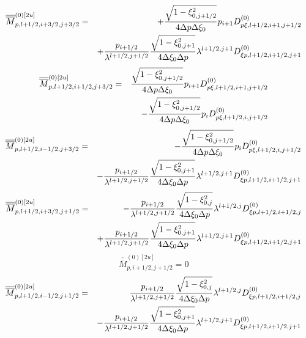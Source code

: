\begin{eqnarray}
\overline{\overline{M}}_{p,l+1/2,i+3/2,j+3/2}^{\left( 0\right) \left[ 2u%
\right] } &=&+\frac{\sqrt{1-\xi _{0,j+1/2}^{2}}}{4\Delta p\Delta \xi _{0}}%
p_{i+1}D_{p\xi ,l+1/2,i+1,j+1/2}^{\left( 0\right) }  \notag \\
&&+\frac{p_{i+1/2}}{\lambda ^{l+1/2,j+1/2}}\frac{\sqrt{1-\xi _{0,j+1}^{2}}}{%
4\Delta \xi _{0}\Delta p}\lambda ^{l+1/2,j+1}D_{\xi
p,l+1/2,i+1/2,j+1}^{\left( 0\right) }
\end{eqnarray}%
\begin{eqnarray}
\overline{\overline{M}}_{p,l+1/2,i+1/2,j+3/2}^{\left( 0\right) \left[ 2u%
\right] } &=&\frac{\sqrt{1-\xi _{0,j+1/2}^{2}}}{4\Delta p\Delta \xi _{0}}%
p_{i+1}D_{p\xi ,l+1/2,i+1,j+1/2}^{\left( 0\right) }  \notag \\
&&-\frac{\sqrt{1-\xi _{0,j+1/2}^{2}}}{4\Delta p\Delta \xi _{0}}p_{i}D_{p\xi
,l+1/2,i,j+1/2}^{\left( 0\right) }
\end{eqnarray}%
\begin{eqnarray}
\overline{\overline{M}}_{p,l+1/2,i-1/2,j+3/2}^{\left( 0\right) \left[ 2u%
\right] } &=&-\frac{\sqrt{1-\xi _{0,j+1/2}^{2}}}{4\Delta p\Delta \xi _{0}}%
p_{i}D_{p\xi ,l+1/2,i,j+1/2}^{\left( 0\right) }  \notag \\
&&-\frac{p_{i+1/2}}{\lambda ^{l+1/2,j+1/2}}\frac{\sqrt{1-\xi _{0,j+1}^{2}}}{%
4\Delta \xi _{0}\Delta p}\lambda ^{l+1/2,j+1}D_{\xi
p,l+1/2,i+1/2,j+1}^{\left( 0\right) }
\end{eqnarray}%
\begin{eqnarray}
\overline{\overline{M}}_{p,l+1/2,i+3/2,j+1/2}^{\left( 0\right) \left[ 2u%
\right] } &=&-\frac{p_{i+1/2}}{\lambda ^{l+1/2,j+1/2}}\frac{\sqrt{1-\xi
_{0,j}^{2}}}{4\Delta \xi _{0}\Delta p}\lambda ^{l+1/2,j}D_{\xi
p,l+1/2,i+1/2,j}^{\left( 0\right) }  \notag \\
&&+\frac{p_{i+1/2}}{\lambda ^{l+1/2,j+1/2}}\frac{\sqrt{1-\xi _{0,j+1}^{2}}}{%
4\Delta \xi _{0}\Delta p}\lambda ^{l+1/2,j+1}D_{\xi
p,l+1/2,i+1/2,j+1}^{\left( 0\right) }
\end{eqnarray}%
\begin{equation}
\overline{\overline{M}}_{p,i+1/2,j+1/2}^{\left( 0\right) \left[ 2u\right] }=0
\end{equation}%
\begin{eqnarray}
\overline{\overline{M}}_{p,l+1/2,i-1/2,j+1/2}^{\left( 0\right) \left[ 2u%
\right] } &=&\frac{p_{i+1/2}}{\lambda ^{l+1/2,j+1/2}}\frac{\sqrt{1-\xi
_{0,j}^{2}}}{4\Delta \xi _{0}\Delta p}\lambda ^{l+1/2,j}D_{\xi
p,l+1/2,i+1/2,j}^{\left( 0\right) }  \notag \\
&&-\frac{p_{i+1/2}}{\lambda ^{l+1/2,j+1/2}}\frac{\sqrt{1-\xi _{0,j+1}^{2}}}{%
4\Delta \xi _{0}\Delta p}\lambda ^{l+1/2,j+1}D_{\xi
p,l+1/2,i+1/2,j+1}^{\left( 0\right) }
\end{eqnarray}%
